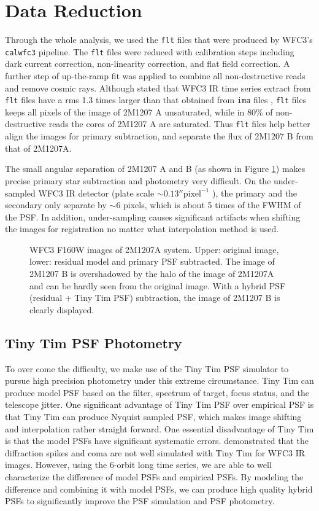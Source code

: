 \documentclass[apj]{emulateapj}
\newcommand{\ima}{\texttt{ima} files }
\newcommand{\flt}{\texttt{flt} files }
\begin{document}
\section{Data Reduction}

Through the whole analysis, we used the \flt that were produced by
WFC3's \texttt{calwfc3} pipeline. The \flt were reduced with
calibration steps including dark current correction, non-linearity
correction, and flat field correction. A further step of up-the-ramp
fit was applied to combine all non-destructive reads and remove cosmic
rays. Although \cite{Mandell2013} stated that WFC3 IR time series
extract from {\flt} have a rms 1.3 times larger than that obtained
from {\ima}, \flt keeps all pixels of the image of 2M1207 A
unsaturated, while in 80\% of non-destructive reads the cores of
2M1207 A are saturated. Thus \flt help better align the images for
primary subtraction, and separate the flux of 2M1207 B from that of
2M1207A.

The small angular separation of 2M1207 A and B (as shown in Figure
\ref{fig:1}) makes precise primary star subtraction and photometry
very difficult. On the under-sampled WFC3 IR detector (plate scale
$\sim 0.13''\mbox{pixel}^{-1}$ \cite{dressel2012wide}), the primary
and the secondary only separate by $\sim 6$ pixels, which is about 5
times of the FWHM of the PSF. In addition, under-sampling causes
significant artifacts when shifting the images for registration no
matter what interpolation method is used.

\begin{figure}
  \centering
  \caption{WFC3 F160W images of 2M1207A system. Upper: original image,
    lower: residual model and primary PSF subtracted. The image of
    2M1207 B is overshadowed by the halo of the image of 2M1207A and
    can be hardly seen from the original image. With a hybrid PSF
    (residual + Tiny Tim PSF) subtraction, the image of 2M1207 B is
    clearly displayed.}
  \label{fig:1}
\end{figure}

\subsection{Tiny Tim PSF Photometry}
To over come the difficulty, we make use of the Tiny Tim PSF simulator
to pursue high precision photometry under this extreme
circumstance. Tiny Tim can produce model PSF based on the filter,
spectrum of target, focus status, and the telescope jitter. One
significant advantage of Tiny Tim PSF over empirical PSF is that Tiny Tim can
produce Nyquist sampled PSF, which makes image shifting and interpolation
rather straight forward. One essential disadvantage of Tiny Tim is
that the model PSFs have significant systematic
errors. \cite{Biretta2014} demonstrated that the diffraction
spikes and coma are not well simulated with Tiny Tim for WFC3 IR
images. However, using the 6-orbit long time series, we are able
to well characterize the difference of model PSFs and empirical PSFs.
By modeling the difference and combining it with model PSFs, we can
produce high quality hybrid PSFs to significantly improve the PSF
simulation and PSF photometry.
\end{document}
